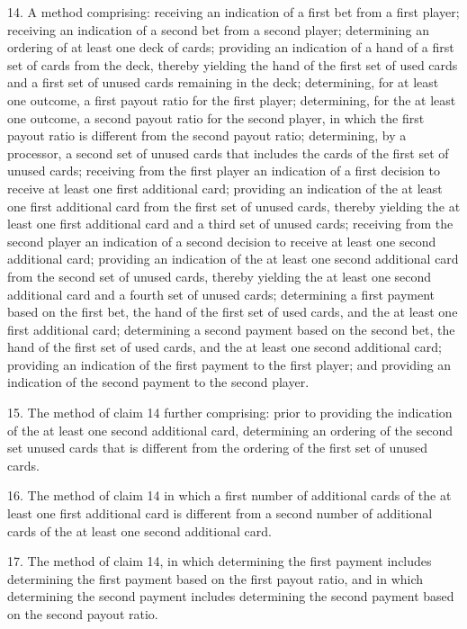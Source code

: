 \documentclass[11pt,a4paper]{article}
\begin{document}
14. A method comprising: receiving an indication of a first bet from a first player; receiving an indication of a second bet from a second player; determining an ordering of at least one deck of cards; providing an indication of a hand of a first set of cards from the deck, thereby yielding the hand of the first set of used cards and a first set of unused cards remaining in the deck; determining, for at least one outcome, a first payout ratio for the first player; determining, for the at least one outcome, a second payout ratio for the second player, in which the first payout ratio is different from the second payout ratio; determining, by a processor, a second set of unused cards that includes the cards of the first set of unused cards; receiving from the first player an indication of a first decision to receive at least one first additional card; providing an indication of the at least one first additional card from the first set of unused cards, thereby yielding the at least one first additional card and a third set of unused cards; receiving from the second player an indication of a second decision to receive at least one second additional card; providing an indication of the at least one second additional card from the second set of unused cards, thereby yielding the at least one second additional card and a fourth set of unused cards; determining a first payment based on the first bet, the hand of the first set of used cards, and the at least one first additional card; determining a second payment based on the second bet, the hand of the first set of used cards, and the at least one second additional card; providing an indication of the first payment to the first player; and providing an indication of the second payment to the second player.

15. The method of claim 14 further comprising: prior to providing the indication of the at least one second additional card, determining an ordering of the second set unused cards that is different from the ordering of the first set of unused cards.

16. The method of claim 14 in which a first number of additional cards of the at least one first additional card is different from a second number of additional cards of the at least one second additional card.

17. The method of claim 14, in which determining the first payment includes determining the first payment based on the first payout ratio, and in which determining the second payment includes determining the second payment based on the second payout ratio.
\end{document}
